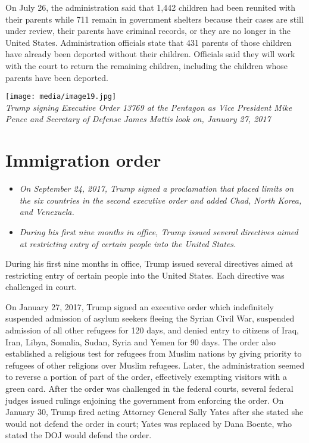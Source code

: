 On July 26, the administration said that 1,442 children had been
reunited with their parents while 711 remain in government shelters
because their cases are still under review, their parents have criminal
records, or they are no longer in the United States. Administration
officials state that 431 parents of those children have already been
deported without their children. Officials said they will work with the
court to return the remaining children, including the children whose
parents have been deported.

\texttt{[image: media/image19.jpg]}\\
\emph{Trump signing Executive Order 13769 at the Pentagon as Vice
President Mike Pence and Secretary of Defense James Mattis look on,
January 27, 2017}

\section{Immigration order}\label{immigration-order}

\begin{itemize}
\item
  \emph{On September 24, 2017, Trump signed a proclamation that placed
  limits on the six countries in the second executive order and added
  Chad, North Korea, and Venezuela.}
\item
  \emph{During his first nine months in office, Trump issued several
  directives aimed at restricting entry of certain people into the
  United States.}
\end{itemize}

During his first nine months in office, Trump issued several directives
aimed at restricting entry of certain people into the United States.
Each directive was challenged in court.

On January 27, 2017, Trump signed an executive order which indefinitely
suspended admission of asylum seekers fleeing the Syrian Civil War,
suspended admission of all other refugees for 120 days, and denied entry
to citizens of Iraq, Iran, Libya, Somalia, Sudan, Syria and Yemen for 90
days. The order also established a religious test for refugees from
Muslim nations by giving priority to refugees of other religions over
Muslim refugees. Later, the administration seemed to reverse a portion
of part of the order, effectively exempting visitors with a green card.
After the order was challenged in the federal courts, several federal
judges issued rulings enjoining the government from enforcing the order.
On January 30, Trump fired acting Attorney General Sally Yates after she
stated she would not defend the order in court; Yates was replaced by
Dana Boente, who stated the DOJ would defend the order.

